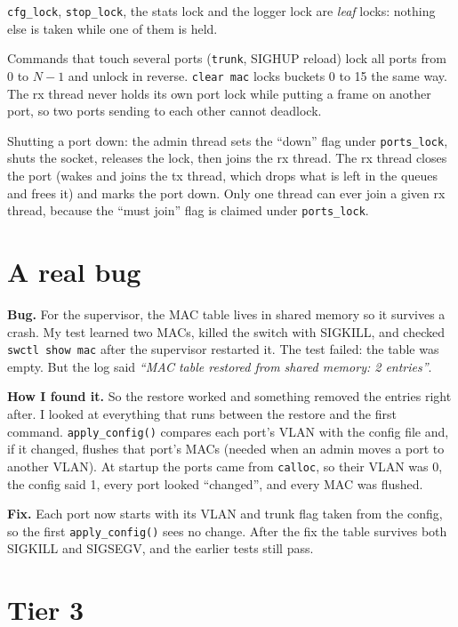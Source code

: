 \documentclass[11pt,a4paper]{article}
\begin{document}
\texttt{cfg\_lock}, \texttt{stop\_lock}, the stats lock and the logger lock are
\emph{leaf} locks: nothing else is taken while one of them is held.

Commands that touch several ports (\texttt{trunk}, SIGHUP reload) lock all
ports from 0 to $N-1$ and unlock in reverse. \texttt{clear mac} locks buckets
0 to 15 the same way. The rx thread never holds its own port lock while putting a
frame on another port, so two ports sending to each other cannot deadlock.

Shutting a port down: the admin thread sets the ``down'' flag under
\texttt{ports\_lock}, shuts the socket, releases the lock, then joins the rx thread.
The rx thread closes the port (wakes and joins the tx thread, which drops what is
left in the queues and frees it) and marks the port down. Only one thread can ever join a
given rx thread, because the ``must join'' flag is claimed under \texttt{ports\_lock}.

\section{A real bug}

\textbf{Bug.} For the supervisor, the MAC table lives in shared memory so it
survives a crash. My test learned two MACs, killed the switch with SIGKILL, and
checked \texttt{swctl show mac} after the supervisor restarted it. The test failed:
the table was empty. But the log said
\emph{``MAC table restored from shared memory: 2 entries''}.

\textbf{How I found it.} So the restore worked and something removed the entries
right after. I looked at everything that runs between the restore and the first
command. \texttt{apply\_config()} compares each port's VLAN with the config file
and, if it changed, flushes that port's MACs (needed when an admin moves a port to
another VLAN). At startup the ports came from \texttt{calloc}, so their VLAN was 0,
the config said 1, every port looked ``changed'', and every MAC was flushed.

\textbf{Fix.} Each port now starts with its VLAN and trunk flag taken from the config,
so the first \texttt{apply\_config()} sees no change. After the fix the table
survives both SIGKILL and SIGSEGV, and the earlier tests still pass.

\section{Tier 3}
\end{document}
